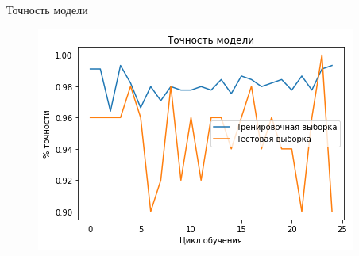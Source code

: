 \begin{frame}{Точность модели}
	\begin{figure}
        \includegraphics[width=\textwidth]{img/acc_cnn.png}
    \end{figure}
\end{frame}
